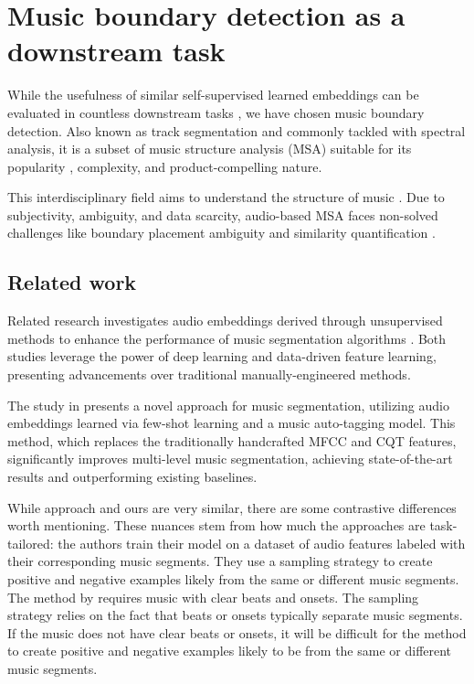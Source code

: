 \section{Music boundary detection as a downstream task}

While the usefulness of similar self-supervised learned embeddings can be evaluated in countless downstream tasks \cite{Li2023MERT:Training, Kim2020OneStrategies}, we have chosen music boundary detection. Also known as track segmentation and commonly tackled with spectral analysis, it is a subset of music structure analysis (MSA) suitable for its popularity \cite{Smith2013ATask}, complexity, and product-compelling nature. 

This interdisciplinary field aims to understand the structure of music \cite{Nieto2020Audio-BasedApplications}. Due to subjectivity, ambiguity, and data scarcity, audio-based MSA faces non-solved challenges like boundary placement ambiguity and similarity quantification \cite{NietoPerceptualMusic}.  

\subsection{Related work}

Related research investigates audio embeddings derived through unsupervised methods to enhance the performance of music segmentation algorithms \cite{deepfeaturesegment, SalamonDeepSegmentation}. Both studies leverage the power of deep learning and data-driven feature learning, presenting advancements over traditional manually-engineered methods.

The study in \cite{deepfeaturesegment} presents a novel approach for music segmentation, utilizing audio embeddings learned via few-shot learning and a music auto-tagging model. This method, which replaces the traditionally handcrafted MFCC and CQT features, significantly improves multi-level music segmentation, achieving state-of-the-art results and outperforming existing baselines.

While \cite{deepfeaturesegment} approach and ours are very similar, there are some contrastive differences worth mentioning. These nuances stem from how much the approaches are task-tailored: the authors train their model on a dataset of audio features labeled with their corresponding music segments. They use a sampling strategy to create positive and negative examples likely from the same or different music segments. The method by \cite{deepfeaturesegment} requires music with clear beats and onsets. The sampling strategy relies on the fact that beats or onsets typically separate music segments. If the music does not have clear beats or onsets, it will be difficult for the method to create positive and negative examples likely to be from the same or different music segments.

